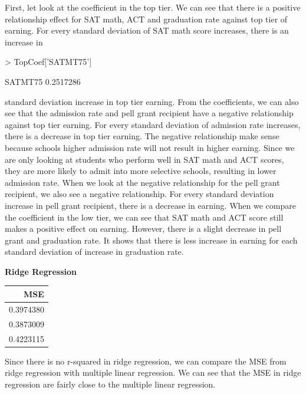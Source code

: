 \documentclass{article}
\begin{document}
First, let look at the coefficient in the top tier.  We can see that there is a positive relationship effect for SAT math, ACT and graduation rate against top tier of earning.  For every standard deviation of SAT math score increases, there is an increase in 
\begin{Schunk}
\begin{Sinput}
> TopCoef['SATMT75']
\end{Sinput}
\begin{Soutput}
  SATMT75 
0.2517286 
\end{Soutput}
\end{Schunk}
standard deviation increase in top tier earning. From the coefficients, we can also see that the admission rate and pell grant recipient have a negative relationship against top tier earning.  For every standard deviation of admission rate increases, there is a decrease in top tier earning.  The negative relationship make sense because schools higher admission rate will not result in higher earning.  Since we are only looking at students who perform well in SAT math and ACT scores, they are more likely to admit into more selective schools, resulting in lower admission rate. When we look at the negative relationship for the pell grant recipient, we also see a negative relationship.  For every standard deviation increase in pell grant recipient, there is a decrease in earning. 
When we compare the coefficient in the low tier, we can see that SAT math and ACT score still makes a positive effect on earning. However, there is a slight decrease in pell grant and graduation rate.  It shows that there is less increase in earning for each standard deviation of increase in graduation rate. 
\newline
\newline

\textbf{Ridge Regression}\newline
\begin{table}[ht]
\centering
\begin{tabular}{r}
  \hline
MSE \\ 
  \hline
0.3974380 \\ 
  0.3873009 \\ 
  0.4223115 \\ 
   \hline
\end{tabular}
\end{table}Since there is no r-squared in ridge regression, we can compare the MSE from ridge regression with multiple linear regression. We can see that the MSE in ridge regression are fairly close to the multiple linear regression. 
\end{document}
